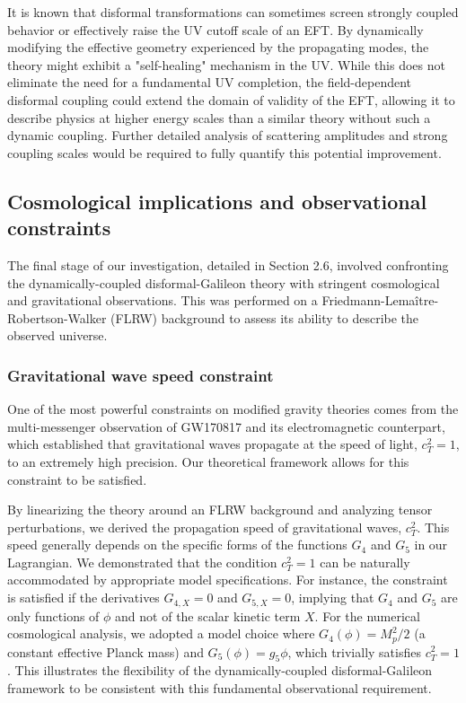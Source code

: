 \documentclass[twocolumn]{aastex631}
\begin{document}
It is known that disformal transformations can sometimes screen strongly coupled behavior or effectively raise the UV cutoff scale of an EFT. By dynamically modifying the effective geometry experienced by the propagating modes, the theory might exhibit a "self-healing" mechanism in the UV. While this does not eliminate the need for a fundamental UV completion, the field-dependent disformal coupling could extend the domain of validity of the EFT, allowing it to describe physics at higher energy scales than a similar theory without such a dynamic coupling. Further detailed analysis of scattering amplitudes and strong coupling scales would be required to fully quantify this potential improvement.

\subsection{Cosmological implications and observational constraints}

The final stage of our investigation, detailed in Section 2.6, involved confronting the dynamically-coupled disformal-Galileon theory with stringent cosmological and gravitational observations. This was performed on a Friedmann-Lema\^itre-Robertson-Walker (FLRW) background to assess its ability to describe the observed universe.

\subsubsection{Gravitational wave speed constraint}
One of the most powerful constraints on modified gravity theories comes from the multi-messenger observation of GW170817 and its electromagnetic counterpart, which established that gravitational waves propagate at the speed of light, $c_T^2=1$, to an extremely high precision. Our theoretical framework allows for this constraint to be satisfied.

By linearizing the theory around an FLRW background and analyzing tensor perturbations, we derived the propagation speed of gravitational waves, $c_T^2$. This speed generally depends on the specific forms of the functions $G_4$ and $G_5$ in our Lagrangian. We demonstrated that the condition $c_T^2=1$ can be naturally accommodated by appropriate model specifications. For instance, the constraint is satisfied if the derivatives $G_{4,X}=0$ and $G_{5,X}=0$, implying that $G_4$ and $G_5$ are only functions of $\phi$ and not of the scalar kinetic term $X$. For the numerical cosmological analysis, we adopted a model choice where $G_4(\phi) = M_p^2/2$ (a constant effective Planck mass) and $G_5(\phi) = g_5 \phi$, which trivially satisfies $c_T^2=1$. This illustrates the flexibility of the dynamically-coupled disformal-Galileon framework to be consistent with this fundamental observational requirement.
\end{document}
